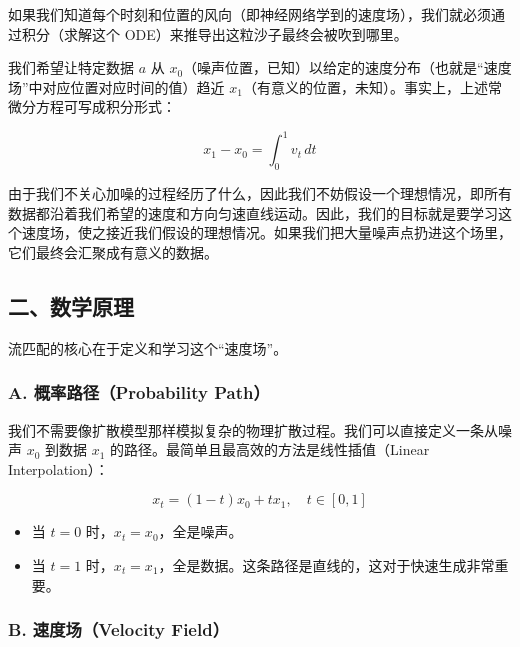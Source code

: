 如果我们知道每个时刻和位置的风向（即神经网络学到的速度场），我们就必须通过积分（求解这个 ODE）来推导出这粒沙子最终会被吹到哪里。

我们希望让特定数据 \(a\) 从 \(x_0\)（噪声位置，已知）以给定的速度分布（也就是``速度场''中对应位置对应时间的值）趋近 \(x_1\)（有意义的位置，未知）。事实上，上述常微分方程可写成积分形式：

\[
x_1-x_0=\int_0^1 v_t\,dt
\]

由于我们不关心加噪的过程经历了什么，因此我们不妨假设一个理想情况，即所有数据都沿着我们希望的速度和方向匀速直线运动。因此，我们的目标就是要学习这个速度场，使之接近我们假设的理想情况。如果我们把大量噪声点扔进这个场里，它们最终会汇聚成有意义的数据。

\hypertarget{ux4e8cux6570ux5b66ux539fux7406}{%
\subsection{二、数学原理}\label{ux4e8cux6570ux5b66ux539fux7406}}

流匹配的核心在于定义和学习这个``速度场''。

\hypertarget{a.-ux6982ux7387ux8defux5f84probability-path}{%
\subsubsection{A. 概率路径（Probability Path）}\label{a.-ux6982ux7387ux8defux5f84probability-path}}

我们不需要像扩散模型那样模拟复杂的物理扩散过程。我们可以直接定义一条从噪声 \(x_0\) 到数据 \(x_1\) 的路径。最简单且最高效的方法是线性插值（Linear Interpolation）：

\[
x_t=(1-t)x_0+tx_1,\quad t\in[0,1]
\]

\begin{itemize}
\tightlist
\item
  当 \(t=0\) 时，\(x_t=x_0\)，全是噪声。
\item
  当 \(t=1\) 时，\(x_t=x_1\)，全是数据。这条路径是直线的，这对于快速生成非常重要。
\end{itemize}

\hypertarget{b.-ux901fux5ea6ux573avelocity-field}{%
\subsubsection{B. 速度场（Velocity Field）}\label{b.-ux901fux5ea6ux573avelocity-field}}

